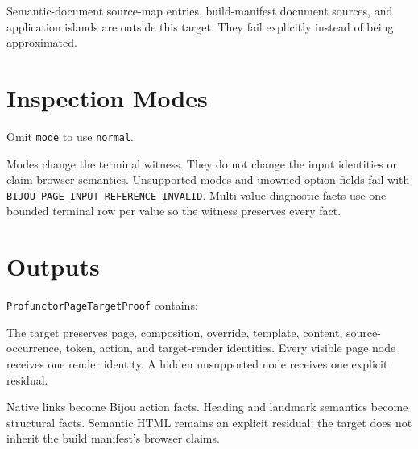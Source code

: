 Semantic-document source-map entries, build-manifest document sources, and application islands are outside this target. They fail explicitly instead of being approximated.

\section{Inspection Modes}\label{record-025-inspection-modes}

Omit \texttt{m\allowbreak{}o\allowbreak{}d\allowbreak{}e} to use \texttt{n\allowbreak{}o\allowbreak{}r\allowbreak{}m\allowbreak{}a\allowbreak{}l}.



Modes change the terminal witness. They do not change the input identities or claim browser semantics. Unsupported modes and unowned option fields fail with \texttt{B\allowbreak{}I\allowbreak{}J\allowbreak{}O\allowbreak{}U\allowbreak{}\_\allowbreak{}P\allowbreak{}A\allowbreak{}G\allowbreak{}E\allowbreak{}\_\allowbreak{}I\allowbreak{}N\allowbreak{}P\allowbreak{}U\allowbreak{}T\allowbreak{}\_\allowbreak{}R\allowbreak{}E\allowbreak{}F\allowbreak{}E\allowbreak{}R\allowbreak{}E\allowbreak{}N\allowbreak{}C\allowbreak{}E\allowbreak{}\_\allowbreak{}I\allowbreak{}N\allowbreak{}V\allowbreak{}A\allowbreak{}L\allowbreak{}I\allowbreak{}D}. Multi-value diagnostic facts use one bounded terminal row per value so the witness preserves every fact.

\section{Outputs}\label{record-025-outputs}

\texttt{P\allowbreak{}r\allowbreak{}o\allowbreak{}f\allowbreak{}u\allowbreak{}n\allowbreak{}c\allowbreak{}t\allowbreak{}o\allowbreak{}r\allowbreak{}P\allowbreak{}a\allowbreak{}g\allowbreak{}e\allowbreak{}T\allowbreak{}a\allowbreak{}r\allowbreak{}g\allowbreak{}e\allowbreak{}t\allowbreak{}P\allowbreak{}r\allowbreak{}o\allowbreak{}o\allowbreak{}f} contains:



The target preserves page, composition, override, template, content, source-occurrence, token, action, and target-render identities. Every visible page node receives one render identity. A hidden unsupported node receives one explicit residual.

Native links become Bijou action facts. Heading and landmark semantics become structural facts. Semantic HTML remains an explicit residual; the target does not inherit the build manifest's browser claims.

